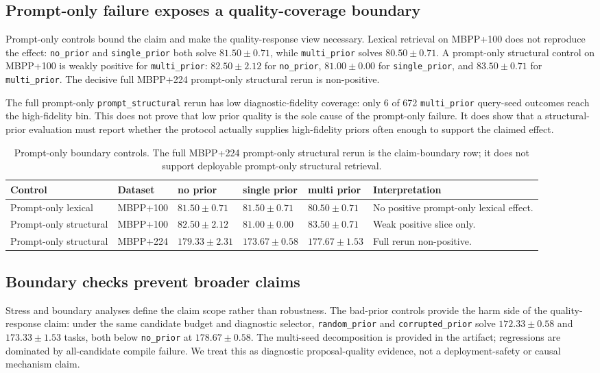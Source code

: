 \documentclass{article}
\newcommand{\code}[1]{\texttt{#1}}
\begin{document}
\subsection{Prompt-only failure exposes a quality-coverage boundary}
Prompt-only controls bound the claim and make the quality-response view necessary. Lexical retrieval on MBPP+100 does not reproduce the effect: \code{no\_prior} and \code{single\_prior} both solve $81.50 \pm 0.71$, while \code{multi\_prior} solves $80.50 \pm 0.71$. A prompt-only structural control on MBPP+100 is weakly positive for \code{multi\_prior}: $82.50 \pm 2.12$ for \code{no\_prior}, $81.00 \pm 0.00$ for \code{single\_prior}, and $83.50 \pm 0.71$ for \code{multi\_prior}. The decisive full MBPP+224 prompt-only structural rerun is non-positive.

The full prompt-only \code{prompt\_structural} rerun has low diagnostic-fidelity coverage: only 6 of 672 \code{multi\_prior} query-seed outcomes reach the high-fidelity bin. This does not prove that low prior quality is the sole cause of the prompt-only failure. It does show that a structural-prior evaluation must report whether the protocol actually supplies high-fidelity priors often enough to support the claimed effect.

\begin{table}[H]
\caption{Prompt-only boundary controls. The full MBPP+224 prompt-only structural rerun is the claim-boundary row; it does not support deployable prompt-only structural retrieval.}
\label{tab:prompt-only}
\centering
\scriptsize
\begin{tabularx}{\linewidth}{l l l l l Y}
\toprule
Control & Dataset & no prior & single prior & multi prior & Interpretation \\
\midrule
Prompt-only lexical & MBPP+100 & $81.50 \pm 0.71$ & $81.50 \pm 0.71$ & $80.50 \pm 0.71$ & No positive prompt-only lexical effect. \\
Prompt-only structural & MBPP+100 & $82.50 \pm 2.12$ & $81.00 \pm 0.00$ & $83.50 \pm 0.71$ & Weak positive slice only. \\
Prompt-only structural & MBPP+224 & $179.33 \pm 2.31$ & $173.67 \pm 0.58$ & $177.67 \pm 1.53$ & Full rerun non-positive. \\
\bottomrule
\end{tabularx}
\end{table}

\subsection{Boundary checks prevent broader claims}
Stress and boundary analyses define the claim scope rather than robustness. The bad-prior controls provide the harm side of the quality-response claim: under the same candidate budget and diagnostic selector, \code{random\_prior} and \code{corrupted\_prior} solve $172.33 \pm 0.58$ and $173.33 \pm 1.53$ tasks, both below \code{no\_prior} at $178.67 \pm 0.58$. The multi-seed decomposition is provided in the artifact; regressions are dominated by all-candidate compile failure. We treat this as diagnostic proposal-quality evidence, not a deployment-safety or causal mechanism claim.
\end{document}
